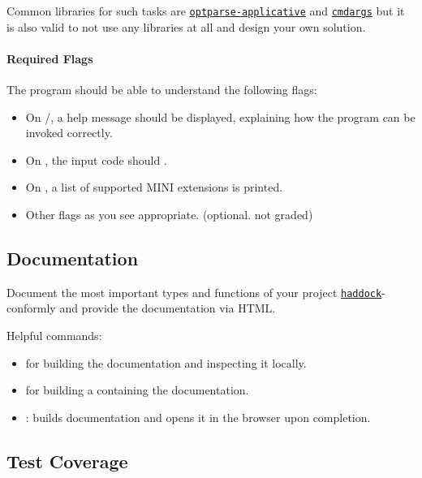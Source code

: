 \documentclass{article}
\begin{document}
Common libraries for such tasks are \href{https://hackage.haskell.org/package/optparse-applicative}{\texttt{optparse-applicative}} 
and \href{https://hackage.haskell.org/package/cmdargs}{\texttt{cmdargs}} but it is also valid to not use any libraries at all 
and design your own solution.

\paragraph{Required Flags}

The program should be able to understand the following flags:

\begin{itemize}
\item On /, a help message should be displayed, explaining how the program can be invoked correctly.
\item On , the input code should .
\item On , a list of supported MINI extensions is printed.
\item Other flags as you see appropriate. (optional. not graded)
\end{itemize}

\subsection{Documentation}

Document the most important types and functions of your project \href{https://haskell-haddock.readthedocs.io/en/latest/markup.html}{\texttt{haddock}}-conformly and provide the documentation via HTML.

Helpful commands:

\begin{itemize}
\item {} for building the documentation and inspecting it locally.
\item {} for building a  containing the documentation.
\item {}: builds documentation and opens it in the browser upon completion.
\end{itemize}

\subsection{Test Coverage}
\end{document}
